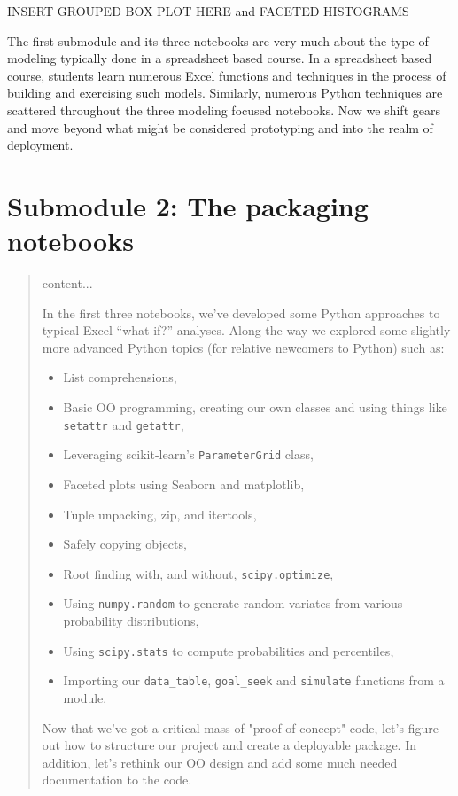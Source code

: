 \documentclass[ited,blindrev]{informs3}              %
\begin{document}
INSERT GROUPED BOX PLOT HERE and FACETED HISTOGRAMS

The first submodule and its three notebooks are very much about the type of modeling typically done in a spreadsheet based course. In a spreadsheet based course, students learn numerous Excel functions and techniques in the process of building and exercising such models. Similarly, numerous Python techniques are scattered throughout the three modeling focused notebooks. Now we shift gears and move beyond what might be considered prototyping and into the realm of deployment. 

\section{Submodule 2: The packaging notebooks}



\begin{quote}
	content...

In the first three notebooks, we've developed some Python approaches to
typical Excel ``what if?'' analyses. Along the way we explored some
slightly more advanced Python topics (for relative newcomers to Python)
such as:

\begin{itemize}
	\tightlist
	\item
	List comprehensions,
	\item
	Basic OO programming, creating our own classes and using things like
	\texttt{setattr} and \texttt{getattr},
	\item
	Leveraging scikit-learn's \texttt{ParameterGrid} class,
	\item
	Faceted plots using Seaborn and matplotlib,
	\item
	Tuple unpacking, zip, and itertools,
	\item
	Safely copying objects,
	\item
	Root finding with, and without, \texttt{scipy.optimize},
	\item
	Using \texttt{numpy.random} to generate random variates from various
	probability distributions,
	\item
	Using \texttt{scipy.stats} to compute probabilities and percentiles,
	\item
	Importing our \texttt{data\_table}, \texttt{goal\_seek} and
	\texttt{simulate} functions from a module.
\end{itemize}

Now that we've got a critical mass of "proof of concept" code, let's figure out how to structure our project and create a deployable package. In addition, let's rethink our OO design and add some much needed documentation to the code.
\end{quote}
\end{document}

